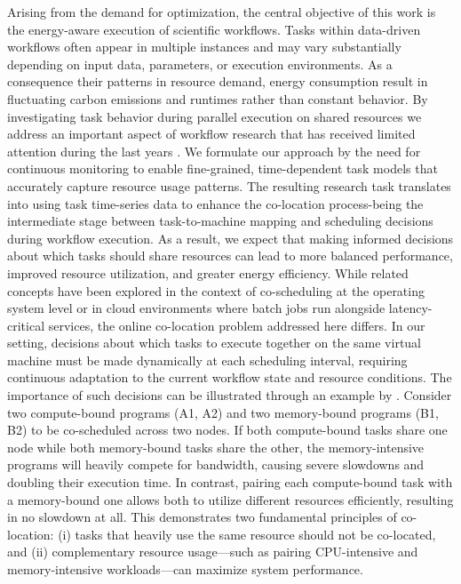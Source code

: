 Arising from the demand for optimization, the central objective of this work is the energy-aware execution of scientific workflows. Tasks within data-driven workflows often appear in multiple instances and may vary substantially depending on input data, parameters, or execution environments. As a consequence their patterns in resource demand, energy consumption result in fluctuating carbon emissions and runtimes rather than constant behavior. By investigating task behavior during parallel execution on shared resources we address an important aspect of workflow research that has received limited attention during the last years \cite{9284517} \cite{Choudhary_2022} \cite{Durillo_2014}.
We formulate our approach by the need for continuous monitoring to enable fine-grained, time-dependent task models that accurately capture resource usage patterns. The resulting research task translates into using task time-series data to enhance the co-location process-being the intermediate stage between task-to-machine mapping and scheduling decisions during workflow execution.
As a result, we expect that making informed decisions about which tasks should share resources can lead to more balanced performance, improved resource utilization, and greater energy efficiency.
While related concepts have been explored in the context of co-scheduling at the operating system level or in cloud environments where batch jobs run alongside latency-critical services, the online co-location problem addressed here differs. In our setting, decisions about which tasks to execute together on the same virtual machine must be made dynamically at each scheduling interval, requiring continuous adaptation to the current workflow state and resource conditions. The importance of such decisions can be illustrated through an example by \cite{inproceedings}. Consider two compute-bound programs (A1, A2) and two memory-bound programs (B1, B2) to be co-scheduled across two nodes. If both compute-bound tasks share one node while both memory-bound tasks share the other, the memory-intensive programs will heavily compete for bandwidth, causing severe slowdowns and doubling their execution time. In contrast, pairing each compute-bound task with a memory-bound one allows both to utilize different resources efficiently, resulting in no slowdown at all. This demonstrates two fundamental principles of co-location: (i) tasks that heavily use the same resource should not be co-located, and (ii) complementary resource usage—such as pairing CPU-intensive and memory-intensive workloads—can maximize system performance.
